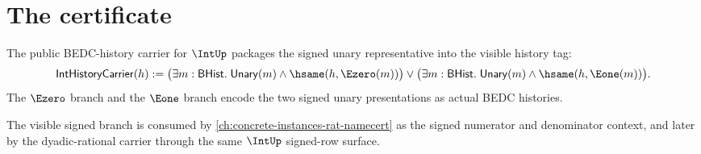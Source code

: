 \section{The certificate}

\begin{definition}
\label{def:intup-history-carrier}
The public BEDC-history carrier for $\IntUp$ packages the signed unary
representative into the visible history tag:
$$
\mathsf{IntHistoryCarrier}(h)
:=
\bigl(\exists m:\mathsf{BHist}.\;
\mathsf{Unary}(m)\land\hsame(h,\Ezero(m))\bigr)
\lor
\bigl(\exists m:\mathsf{BHist}.\;
\mathsf{Unary}(m)\land\hsame(h,\Eone(m))\bigr).
$$
The $\Ezero$ branch and the $\Eone$ branch encode the two signed unary
presentations as actual BEDC histories.
\end{definition}

The visible signed branch is consumed by \autoref{ch:concrete-instances-rat-namecert} as the signed numerator and denominator context, and later by the dyadic-rational carrier through the same $\IntUp$ signed-row surface.

